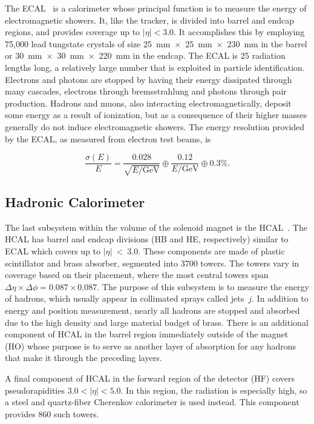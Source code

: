 The ECAL~\cite{ecaltdr} is a calorimeter whose principal function is to measure the energy of electromagnetic showers.
It, like the tracker, is divided into barrel and endcap regions, and provides coverage up to
$|\eta| < 3.0$.
It accomplishes this by employing 75,000 lead tungstate crystals of size
25~mm~$\times$~25~mm~$\times$~230~mm in the barrel or 30~mm~$\times$~30~mm~$\times$~220~mm
in the endcap.
The ECAL is 25 radiation lengths long, a relatively large number that is exploited in
particle identification. Electrons and photons are stopped by having their energy dissipated
through many cascades, electrons through bremsstrahlung and photons through pair production.
Hadrons and muons, also interacting electromagnetically, deposit some energy as a result of ionization,
but as a consequence of their higher masses generally do not induce electromagnetic showers.
The energy resolution provided by the ECAL, as measured from electron test beams, is

\begin{equation}
\frac{\sigma(E)}{E} = \frac{0.028}{\sqrt{E/\textrm{GeV}}} \oplus \frac{0.12}{E/\textrm{GeV}} \oplus 0.3\% .
\end{equation}

\subsection{Hadronic Calorimeter\label{subsec:hcal}}

The last subsystem within the volume of the solenoid magnet is the HCAL~\cite{hcaltdr}.
The HCAL has barrel and endcap divisions (HB and HE, respectively) similar to ECAL which
covers up to $|\eta|~<~3.0$.
These components are made of plastic scintillator and brass absorber, segmented into 3700 towers. The
towers vary in coverage based on their placement, where the most central towers span
$\Delta\eta \times \Delta\phi = 0.087 \times 0.087$. The purpose of this subsystem is to
measure the energy of hadrons, which usually appear in collimated sprays called jets~$j$. In addition
to energy and position measurement, nearly all hadrons are stopped and absorbed due to the
high density and large material budget of brass. There is an additional component of HCAL
in the barrel region immediately outside of the magnet (HO) whose purpose is to serve as another
layer of absorption for any hadrons that make it through the preceding layers.

A final component of HCAL in the forward region of the detector (HF)
covers pseudorapidities $3.0 < |\eta|< 5.0$. In this region, the
radiation is especially high, so a steel and quartz-fiber Cherenkov calorimeter is used instead.
This component provides 860 such towers.

